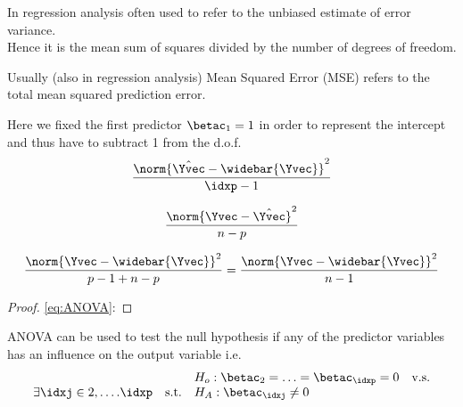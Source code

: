 \begin{defnbox}\nospacing
  \begin{defn}\label{defn:}
    In regression analysis often used to refer to the unbiased estimate of error
    variance.\\
    Hence it is the mean sum of squares divided by the number of degrees of freedom.
  \end{defn}
\end{defnbox}
\begin{notebox}[Attention]\nospacing
  Usually (also in regression analysis) Mean Squared Error (MSE) refers to the total
  mean squared prediction error.
\end{notebox}
\begin{defnbox}\nospacing
  \begin{defn}
    Here we fixed the first predictor $\betac_1=1$ in order to represent the
    intercept and thus have to subtract 1 from the d.o.f.\
    \begin{align*}
      \frac{\norm{\hat{\Yvec}-\widebar{\Yvec}}^2}{\idxp-1}
    \end{align*}
  \end{defn}
\end{defnbox}
\begin{defnbox}\nospacing
  \begin{defn}\label{defn:}
    \begin{align*}
       \frac{\norm{\Yvec-\hat{\Yvec}}^2}{n-p}
    \end{align*}
  \end{defn}
\end{defnbox}
\begin{defnbox}\nospacing
  \begin{defn}\label{defn:}
    \begin{align*}
       \frac{\norm{\Yvec-\widebar{\Yvec}}^2}{p-1+n-p}=
       \frac{\norm{\Yvec-\widebar{\Yvec}}^2}{n-1}
    \end{align*}
  \end{defn}
\end{defnbox}
\begin{proofbox}\nospacing
   \begin{proof} \cref{eq:ANOVA}:
   \end{proof} 
\end{proofbox}
\begin{sectionbox}[Null hypothesis]\nospacing
     ANOVA can be used to test the null hypothesis if any of the predictor
     variables has an influence on the output variable i.e.
     \begin{align*}
       &&&&&H_o:\betac_2=\ldots=\betac_{\idxp}=0&&\text{v.s.}\\[-1\jot]
       &\exists\idxj\in{2,\ldots.\idxp}&&\text{s.t.}&& H_A:\betac_{\idxj}\neq0
     \end{align*}
\end{sectionbox}
